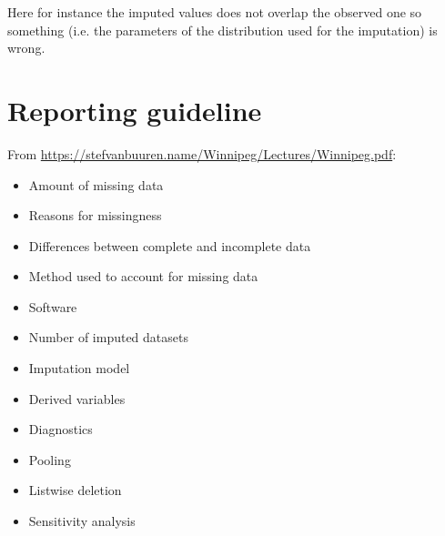 \documentclass[12pt]{article}
\begin{document}
Here for instance the imputed values does not overlap the observed one
so something (i.e. the parameters of the distribution used for the
imputation) is wrong.

\clearpage

\section{Reporting guideline}
\label{sec:org3a3313b}
From \url{https://stefvanbuuren.name/Winnipeg/Lectures/Winnipeg.pdf}:
\begin{itemize}
\item Amount of missing data
\item Reasons for missingness
\item Differences between complete and incomplete data
\item Method used to account for missing data
\item Software
\item Number of imputed datasets
\item Imputation model
\item Derived variables
\item Diagnostics
\item Pooling
\item Listwise deletion
\item Sensitivity analysis
\end{itemize}
\end{document}
